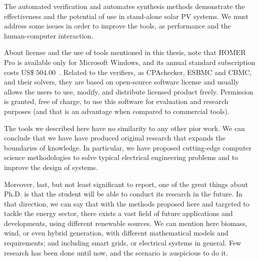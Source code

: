 The automated verification and automates synthesis methods demonstrate the effectiveness and the potential of use in stand-alone solar PV systems. We must address some issues in order to improve the tools, as performance and the human-computer interaction.

About license and the use of tools mentioned in this thesis, note that HOMER Pro is available only for Microsoft Windows, and its annual standard subscription costs US\$ $504.00$~\cite{HOMER}. Related to the verifiers, as CPAchecker, ESBMC and CBMC, and their solvers, they are based on open-source software license and usually allows the users to use, modify, and distribute licensed product freely. Permission is granted, free of charge, to use this software for evaluation and research purposes (and that is an advantage when compared to commercial tools).

The tools we described here have no similarity to any other pior work.  We can conclude that we have have produced original research that expands the boundaries of knowledge. In particular, we have proposed cutting-edge computer science methodologies to solve typical electrical engineering problems and to improve the design of systems.

Moreover, last, but not least significant to report, one of the great things about Ph.D. is that the student will be able to conduct its research in the future. In that direction, we can say that with the methods proposed here and targeted to tackle the energy sector, there exists a vast field of future applications and developments, using different renewable sources. We can mention here biomass, wind, or even hybrid generation, with different mathematical models and requirements; and including smart grids, or electrical systems in general. Few research has been done until now, and the scenario is auspicious to do it.
